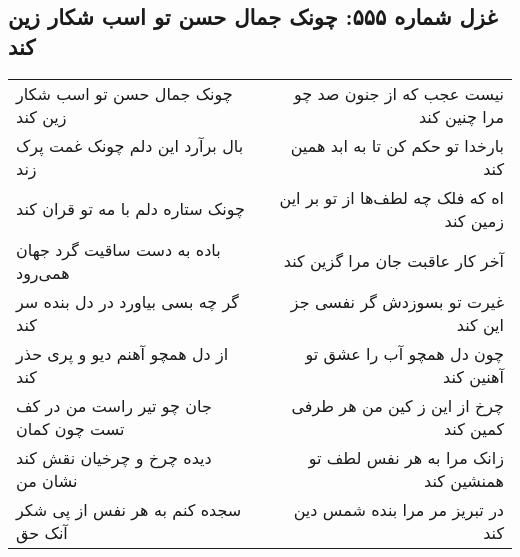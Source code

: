 \begin{center}
\section*{غزل شماره ۵۵۵: چونک جمال حسن تو اسب شکار زین کند}
\label{sec:0555}
\begin{longtable}{l p{0.5cm} r}
چونک جمال حسن تو اسب شکار زین کند
&&
نیست عجب که از جنون صد چو مرا چنین کند
\\
بال برآرد این دلم چونک غمت پرک زند
&&
بارخدا تو حکم کن تا به ابد همین کند
\\
چونک ستاره دلم با مه تو قران کند
&&
اه که فلک چه لطف‌ها از تو بر این زمین کند
\\
باده به دست ساقیت گرد جهان همی‌رود
&&
آخر کار عاقبت جان مرا گزین کند
\\
گر چه بسی بیاورد در دل بنده سر کند
&&
غیرت تو بسوزدش گر نفسی جز این کند
\\
از دل همچو آهنم دیو و پری حذر کند
&&
چون دل همچو آب را عشق تو آهنین کند
\\
جان چو تیر راست من در کف تست چون کمان
&&
چرخ از این ز کین من هر طرفی کمین کند
\\
دیده چرخ و چرخیان نقش کند نشان من
&&
زانک مرا به هر نفس لطف تو همنشین کند
\\
سجده کنم به هر نفس از پی شکر آنک حق
&&
در تبریز مر مرا بنده شمس دین کند
\\
\end{longtable}
\end{center}
